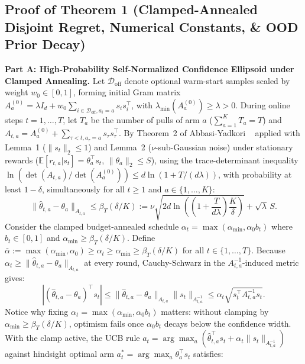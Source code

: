 \documentclass[10pt,twocolumn,letterpaper]{article}
\begin{document}
\subsection{Proof of Theorem 1 (Clamped-Annealed Disjoint Regret, Numerical Constants, \& OOD Prior Decay)}
\textbf{Part A: High-Probability Self-Normalized Confidence Ellipsoid under Clamped Annealing.}
Let $\mathcal{D}_{\text{off}}$ denote optional warm-start samples scaled by weight $w_0 \in [0,1]$, forming initial Gram matrix $A_a^{(0)} = \lambda I_d + w_0 \sum_{i \in \mathcal{D}_{\text{off}}, a_i=a} s_i s_i^\top$, with $\lambda_{\min}(A_a^{(0)}) \ge \lambda > 0$. During online steps $t=1,\dots,T$, let $T_a$ be the number of pulls of arm $a$ ($\sum_{a=1}^K T_a = T$) and $A_{t,a} = A_a^{(0)} + \sum_{\tau < t, a_\tau = a} s_\tau s_\tau^\top$. By Theorem~2 of Abbasi-Yadkori \etal~\citep{abbasi2011improved} applied with Lemma~1 ($\|s_t\|_2 \le 1$) and Lemma~2 ($\nu$-sub-Gaussian noise) under stationary rewards ($\mathbb{E}[r_{t,a}|s_t] = \theta_a^\top s_t$, $\|\theta_a\|_2 \le S$), using the trace-determinant inequality $\ln(\det(A_{t,a})/\det(A_a^{(0)})) \le d \ln(1 + T/(d\lambda))$, with probability at least $1-\delta$, simultaneously for all $t \ge 1$ and $a \in \{1,\dots,K\}$:
\begin{equation}
\|\hat{\theta}_{t,a} - \theta_a\|_{A_{t,a}} \le \beta_T(\delta/K) := \nu \sqrt{2 d \ln\!\left(\left(1 + \frac{T}{d\lambda}\right)\frac{K}{\delta}\right)} + \sqrt{\lambda}\, S.
\end{equation}
Consider the clamped budget-annealed schedule $\alpha_t = \max(\alpha_{\min}, \alpha_0 b_t)$ where $b_t \in [0,1]$ and $\alpha_{\min} \ge \beta_T(\delta/K)$. Define $\bar{\alpha} := \max(\alpha_{\min}, \alpha_0) \ge \alpha_t \ge \alpha_{\min} \ge \beta_T(\delta/K)$ for all $t \in \{1,\dots,T\}$. Because $\alpha_t \ge \|\hat{\theta}_{t,a} - \theta_a\|_{A_{t,a}}$ at every round, Cauchy-Schwarz in the $A_{t,a}^{-1}$-induced metric gives:
\begin{equation}
\left| (\hat{\theta}_{t,a} - \theta_a)^\top s_t \right| \le \|\hat{\theta}_{t,a} - \theta_a\|_{A_{t,a}} \|s_t\|_{A_{t,a}^{-1}} \le \alpha_t \sqrt{s_t^\top A_{t,a}^{-1} s_t}.
\end{equation}
Notice why fixing $\alpha_t = \max(\alpha_{\min}, \alpha_0 b_t)$ matters: without clamping by $\alpha_{\min} \ge \beta_T(\delta/K)$, optimism fails once $\alpha_0 b_t$ decays below the confidence width. With the clamp active, the UCB rule $a_t = \arg\max_a (\hat{\theta}_{t,a}^\top s_t + \alpha_t \|s_t\|_{A_{t,a}^{-1}})$ against hindsight optimal arm $a_t^* = \arg\max_a \theta_a^\top s_t$ satisfies:
\end{document}
